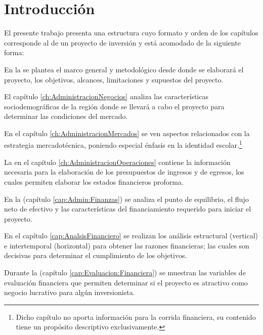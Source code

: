 \chapter{Introducción}
\label{ch:Introduccion}

El presente trabajo presenta una estructura cuyo formato y orden de los capítulos corresponde al de un proyecto de inversión y está acomodado de la siguiente forma:

En la \emph{} se plantea el marco general y metodológico desde donde se elaborará el proyecto, los objetivos, alcances, limitaciones y supuestos del proyecto.

El capítulo \ref{ch:AdministracionNegocios} \emph{} analiza las características sociodemográficas de la región donde se llevará a cabo el proyecto para determinar las condiciones del mercado.

En el capítulo \ref{ch:AdministracionMercados} \emph{} se ven aspectos relacionados con la estrategia mercadotécnica, poniendo especial énfasis en la identidad escolar.\footnote{Dicho capítulo no aporta información para la corrida financiera, su contenido tiene un propósito descriptivo exclusivamente.}

La \emph{} en el capítulo \ref{ch:AdministracionOperaciones} contiene la información necesaria para la elaboración de los presupuestos de ingresos y de egresos, los cuales permiten elaborar los estados financieros proforma.

En la \emph{} (capítulo \ref{cap:Admin:Finanzas}) se analiza el punto de equilibrio, el flujo neto de efectivo y las características del financiamiento requerido para iniciar el proyecto.

En el capítulo \ref{cap:AnalsisFinanciero} \emph{} se realizan los análisis estructural (vertical) e intertemporal (horizontal) para obtener las razones financieras; las cuales son decisivas para determinar el cumplimiento de los objetivos.

Durante la \emph{} (capítulo \ref{cap:Evaluacion:Financiera}) se muestran las variables de evaluación financiera que permiten determinar si el proyecto es atractivo como negocio lucrativo para algún inversionista.

